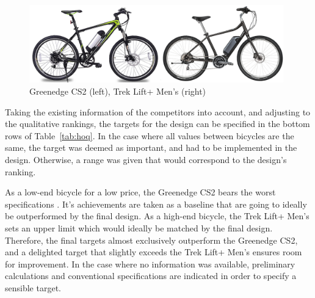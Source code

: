 \documentclass[a4paper,11pt]{article}
\begin{document}
\begin{figure}[!ht]
	\centering
	\includegraphics[width=0.98\textwidth]{bikec}
	\caption{Greenedge CS2 (left), Trek Lift+ Men's (right)}
	\label{fig:bcom}
\end{figure}

Taking the existing information of the competitors into account, and adjusting to the qualitative rankings, the targets for the design can be specified in the bottom rows of Table~\ref{tab:hoq}. In the case where all values between bicycles are the same, the target was deemed as important, and had to be implemented in the design. Otherwise, a range was given that would correspond to the design's ranking.

As a low-end bicycle for a low price, the Greenedge CS2 bears the worst specifications \cite{cs2}. It's achievements are taken as a baseline that are going to ideally be outperformed by the final design. As a high-end bicycle, the Trek Lift+ Men's sets an upper limit \cite{trek} which would ideally be matched by the final design. Therefore, the final targets almost exclusively outperform the Greenedge CS2, and a delighted target that slightly exceeds the Trek Lift+ Men's ensures room for improvement. In the case where no information was available, preliminary calculations and conventional specifications are indicated in order to specify a sensible target.

\newpage
\end{document}
